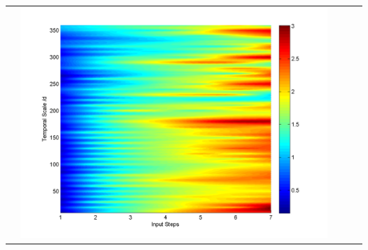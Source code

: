 \documentclass[11pt]{article}
\begin{document}
\begin{table}[H]
{\begin{tabular}{ccccc}
&\begin{minipage}{.3\textwidth}\includegraphics[width=\linewidth]{resultgraph/02143000pepq.png}\end{minipage}
\\


\end{tabular}}
\end{table}
\end{document}
